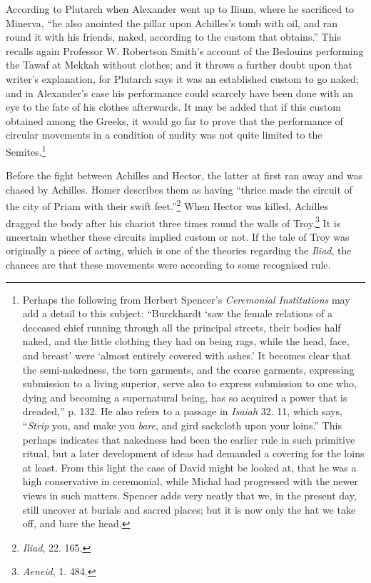 \documentclass[a4paper, 11pt, oneside, polutonikogreek, english]{article}
\begin{document}
According to Plutarch when Alexander went up to Ilium, where he sacrificed to Minerva, ``he also anointed the pillar upon Achilles's tomb with oil, and ran round it with his friends, naked, according to the custom that obtains.'' This recalls again Professor W. Robertson Smith's account of the Bedouins performing the Tawaf at Mekkah without clothes; and it throws a further doubt upon that writer's explanation, for Plutarch says it was an established custom to go naked; and in Alexander's case his performance could scarcely have been done with an eye to the fate of his clothes afterwards. It may be added that if this custom obtained among the Greeks, it would go far to prove that the performance of circular movements in a condition of nudity was not quite limited to the Semites.\footnote{Perhaps the following from Herbert Spencer's \emph{Ceremonial Institutions} may add a detail to this subject: ``Burckhardt `saw the female relations of a deceased chief running through all the principal streets, their bodies half naked, and the little clothing they had on being rags, while the head, face, and breast' were `almost entirely covered with ashes.' It becomes clear that the semi-nakedness, the torn garments, and the coarse garments, expressing submission to a living superior, serve also to express submission to one who, dying and becoming a supernatural being, has so acquired a power that is dreaded,'' p. 132. He also refers to a passage in \emph{Isaiah} 32. 11, which says, ``\emph{Strip} you, and make you \emph{bare}, and gird sackcloth upon your loins.'' This perhaps indicates that nakedness had been the earlier rule in such primitive ritual, but a later development of ideas had demanded a covering for the loins at least. From this light the case of David might be looked at, that he was a high conservative in ceremonial, while Michal had progressed with the newer views in such matters. Spencer adds very neatly that we, in the present day, still uncover at burials and sacred places; but it is now only the hat we take off, and bare the head.}

Before the fight between Achilles and Hector, the latter at first ran away and was chased by Achilles. Homer describes them as having ``thrice made the circuit of the city of Priam with their swift feet.''\footnote{\emph{Iliad}, 22. 165.} When Hector was killed, Achilles dragged the body after his chariot three times round the walls of Troy.\footnote{\emph{Aeneid}, 1. 484.} It is uncertain whether these circuits implied custom or not. If the tale of Troy was originally a piece of acting, which is one of the theories regarding the \emph{Iliad}, the chances are that these movements were according to some recognised rule.
\end{document}
